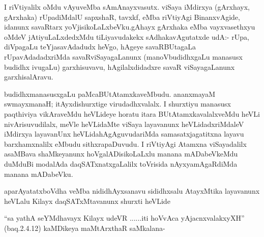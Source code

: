 \begin{artha}
I riVtiyalilx oMdu vAyuveMba sAmAnayxvasutx. viSaya iMdirxya
(gArxhayx, gArxhaka)  rUpadiMdalU sapxshaR, tavxkf,
eMba riVtiyAgi BinanxvAgide, idanunx savaRtarx
yoVjisikoLaLxbeVku.gAhayx gArxhaka eMba vayxvasethxyu oMdeV
jAtiyuLaLxdedxMdu tiLiyavudakekx sAdhakavAgutatxde udA:- rUpa, diVpagaLu
teYjasavAdadudx heVgo, hAgeye savaRBUtagaLa rUpavAdadadxriMda
savaRviSayagaLanunx (manoVbudidhxgaLu manasusx budidhx ivugaLu)
garxhisuvavu, hAgilalxdidadxre savaR viSayagaLanunx garxhisalAravu.

budidhxmanasusxgaLu paMcaBUtAtamxkaveMbudu. ananxmayaM swmayxmanaH;
 itAyxdishurxtige virudadhxvalalx. I shurxtiyu manasusx paqthiviya
vikAraveMdu heVLideye horatu itara BUtAtamxkavalalxveMdu heVLi
nivArisuvudilalx, meVle heVLidaMte viSaya layavanunx heVLidadxriMdaleV
iMdirxya layavanUnx heVLidahAgAguvudariMda samasatxjagatitxna layavu
barxhamxnalilx eMbudu sithxrapaDuvudu. I riVtiyAgi Atamxna
viSayadalilx asaMBava shaMkeyanunx hoVgalADisikoLaLxlu manana
mADabeVkeMdu duMduBi modalAda daqSATxnatxgaLalilx toVrisida
nAyxyamAgaRdiMda manana mADabeVku.
\end{artha}

\begin{artha}
aparAyatatxboVdha veMba nididhAyxsanavu sididhxsalu AtayxMtika
layavanunx heVLalu Kilayx daqSATxMtavanunx shurxti heVLide
\end{artha}

\begin{artha}
``sa yathA seYMdhavayx Kilayx udeVR ......iti hoVvAca yAjacnxvalakxyXH'' (baq.2.4.12) kaMDikeya maMtArxthaR saMkalana-
\end{artha}


